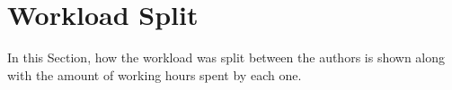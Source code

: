 \section{Workload Split}



In this Section, how the workload was split between the authors is shown along with the amount of working hours spent by each one.

